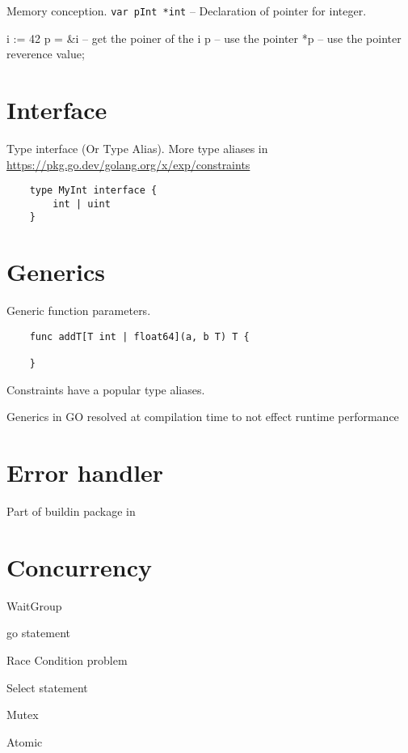 \documentclass[12pt]{article}
\begin{document}
Memory conception.
\texttt{var pInt *int} -- Declaration of pointer for integer.

i := 42
p = \&i -- get the poiner of the i
p       -- use the pointer
*p      -- use the pointer reverence value;
\section{Interface}

Type interface (Or Type Alias). More type aliases in
\href{constraint package}{https://pkg.go.dev/golang.org/x/exp/constraints}

\begin{lstlisting}
    type MyInt interface {
        int | uint
    }
\end{lstlisting}

\section{Generics}
\begin{paracol}{2} \begin{leftcolumn}
Generic function parameters.
\begin{lstlisting}
    func addT[T int | float64](a, b T) T {

    }
\end{lstlisting}

Constraints have a popular type aliases.

\end{leftcolumn}\begin{rightcolumn}
Generics in GO resolved at compilation time to not effect runtime performance
\end{rightcolumn}
\end{paracol}


\section{Error handler}
Part of buildin package in


\section{Concurrency}

WaitGroup

go statement

Race Condition problem

Select statement

Mutex

Atomic
\end{document}
